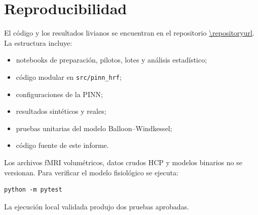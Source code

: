 \section{Reproducibilidad}

El código y los resultados livianos se encuentran en el repositorio \url{\repositoryurl}. La estructura incluye:

\begin{itemize}
    \item notebooks de preparación, pilotos, lotes y análisis estadístico;
    \item código modular en \texttt{src/pinn\_hrf};
    \item configuraciones de la PINN;
    \item resultados sintéticos y reales;
    \item pruebas unitarias del modelo Balloon--Windkessel;
    \item código fuente de este informe.
\end{itemize}

Los archivos fMRI volumétricos, datos crudos HCP y modelos binarios no se versionan. Para verificar el modelo fisiológico se ejecuta:

\begin{verbatim}
python -m pytest
\end{verbatim}

La ejecución local validada produjo dos pruebas aprobadas.
